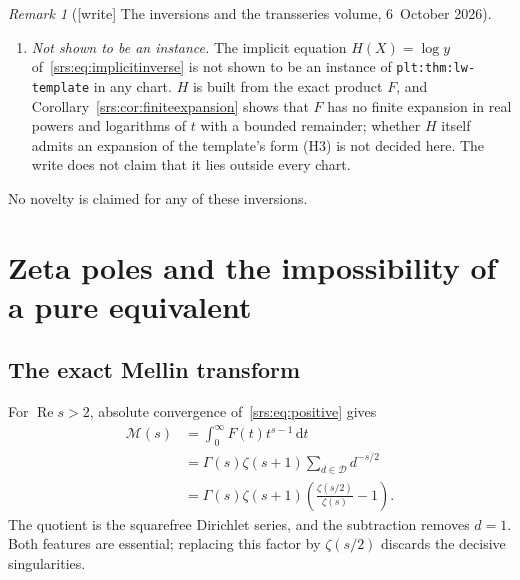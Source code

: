 \documentclass[11pt]{article}
\numberwithin{equation}{section}
\theoremstyle{remark}\newtheorem{remark}[theorem]{Remark}
\newcommand{\dd}{\,\mathrm d}
\newcommand{\Sf}{\mathcal D}
\DeclareMathOperator{\Ree}{Re}
\newcommand{\file}[1]{\nolinkurl{#1}}
\begin{document}
\begin{remark}[{[write]} The inversions and the transseries volume, 6~October 2026]
\begin{enumerate}[label=(\alph*)]
 which is \file{plt:thm:lw-template} with $Z_{\mathrm{vol}}=\log x$,
 $\xi_{\mathrm{vol}}=\log\log y$ and data
 $(\rho_{\mathrm{vol}},\mu_{\mathrm{vol}},\beta_{\mathrm{vol}},B_{\mathrm{vol}})=(2/3,0,\log K,0)$,
 the degenerate case without logarithm or correction series; its answer is
 the power inverse itself. No Lambert function occurs: the leading balance has
 no logarithmic term, so neither \file{p0:thm:lambert-core} nor
 \file{p0:prop:factorial-core} is involved.
\item \emph{Not shown to be an instance.} The implicit equation
 $H(X)=\log y$ of~\eqref{srs:eq:implicitinverse} is not shown to be an
 instance of \file{plt:thm:lw-template} in any chart. $H$ is built from the
 exact product $F$, and Corollary~\ref{srs:cor:finiteexpansion} shows that $F$
 has no finite expansion in real powers and logarithms of $t$ with a bounded
 remainder; whether $H$ itself admits an expansion of the template's form
 (H3) is not decided here. The write does not claim that it lies outside
 every chart.
\end{enumerate}
No novelty is claimed for any of these inversions.
\end{remark}

\section{Zeta poles and the impossibility of a pure equivalent}\label{srs:sec:obstruction}
\subsection{The exact Mellin transform}
For $\Ree s>2$, absolute convergence of~\eqref{srs:eq:positive} gives
\begin{align}
 \mathcal M(s)&=\int_0^\infty F(t)t^{s-1}\dd t\nonumber\\
 &=\Gamma(s)\zeta(s+1)\sum_{d\in\Sf}d^{-s/2}\nonumber\\
 &=\Gamma(s)\zeta(s+1)
       \left(\frac{\zeta(s/2)}{\zeta(s)}-1\right).
 \label{srs:eq:Mellin}
\end{align}
The quotient is the squarefree Dirichlet series, and the subtraction removes $d=1$. Both features are essential; replacing this factor by $\zeta(s/2)$ discards the decisive singularities.
\end{document}
